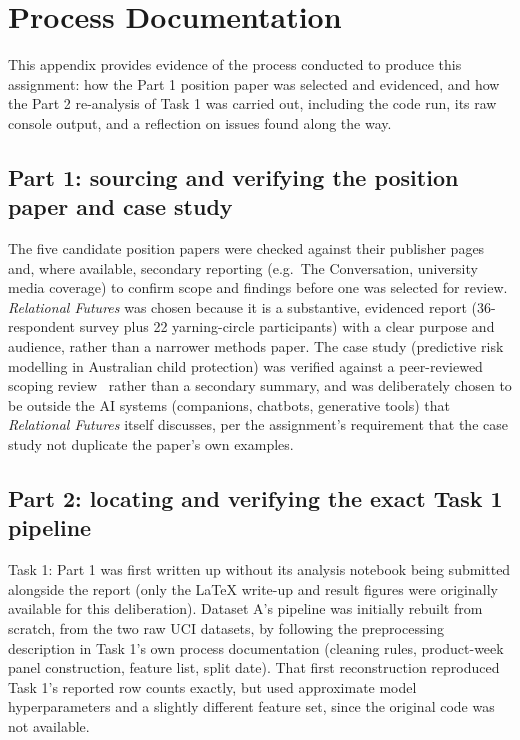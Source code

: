 \section{Process Documentation}
\label{sec:Process Documentation}

This appendix provides evidence of the process conducted to produce this assignment: how the
Part 1 position paper was selected and evidenced, and how the Part 2 re-analysis of Task 1 was
carried out, including the code run, its raw console output, and a reflection on issues found
along the way.

\subsection{Part 1: sourcing and verifying the position paper and case study}

The five candidate position papers were checked against their publisher pages and, where
available, secondary reporting (e.g.\ The Conversation, university media coverage) to confirm
scope and findings before one was selected for review. \emph{Relational Futures} was chosen
because it is a substantive, evidenced report (36-respondent survey plus 22 yarning-circle
participants) with a clear purpose and audience, rather than a narrower methods paper. The case
study (predictive risk modelling in Australian child protection) was verified against a
peer-reviewed scoping review~\cite{krakouer2021analysing} rather than a secondary summary, and
was deliberately chosen to be outside the AI systems (companions, chatbots, generative tools)
that \emph{Relational Futures} itself discusses, per the assignment's requirement that the case
study not duplicate the paper's own examples.

\subsection{Part 2: locating and verifying the exact Task 1 pipeline}

Task 1: Part 1 was first written up without its analysis notebook being submitted alongside the
report (only the LaTeX write-up and result figures were originally available for this
deliberation). Dataset A's pipeline was initially rebuilt from scratch, from the two raw UCI
datasets, by following the preprocessing description in Task 1's own process documentation
(cleaning rules, product-week panel construction, feature list, split date). That first
reconstruction reproduced Task 1's reported row counts exactly, but used approximate model
hyperparameters and a slightly different feature set, since the original code was not available.

